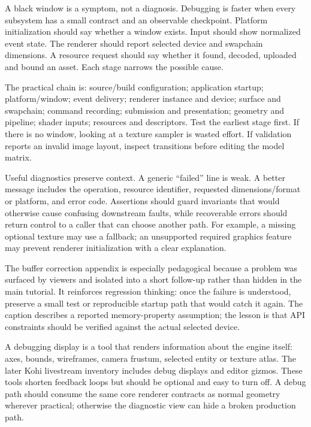 \hypertarget{06-engine-ii-ch041-debug-by-finding-the-earliest-broken-contract}{}

A black window is a symptom, not a diagnosis. Debugging is faster when every subsystem has a small contract and an observable checkpoint. Platform initialization should say whether a window exists. Input should show normalized event state. The renderer should report selected device and swapchain dimensions. A resource request should say whether it found, decoded, uploaded and bound an asset. Each stage narrows the possible cause.

The practical chain is: source/build configuration; application startup; platform/window; event delivery; renderer instance and device; surface and swapchain; command recording; submission and presentation; geometry and pipeline; shader inputs; resources and descriptors. Test the earliest stage first. If there is no window, looking at a texture sampler is wasted effort. If validation reports an invalid image layout, inspect transitions before editing the model matrix.

Useful diagnostics preserve context. A generic ``failed'' line is weak. A better message includes the operation, resource identifier, requested dimensions/format or platform, and error code. Assertions should guard invariants that would otherwise cause confusing downstream faults, while recoverable errors should return control to a caller that can choose another path. For example, a missing optional texture may use a fallback; an unsupported required graphics feature may prevent renderer initialization with a clear explanation.

The buffer correction appendix is especially pedagogical because a problem was surfaced by viewers and isolated into a short follow-up rather than hidden in the main tutorial. It reinforces regression thinking: once the failure is understood, preserve a small test or reproducible startup path that would catch it again. The caption describes a reported memory-property assumption; the lesson is that API constraints should be verified against the actual selected device.

A debugging display is a tool that renders information about the engine itself: axes, bounds, wireframes, camera frustum, selected entity or texture atlas. The later Kohi livestream inventory includes debug displays and editor gizmos. These tools shorten feedback loops but should be optional and easy to turn off. A debug path should consume the same core renderer contracts as normal geometry wherever practical; otherwise the diagnostic view can hide a broken production path.

